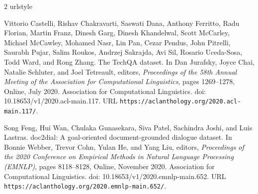 \begin{thebibliography}{2}
\providecommand{\natexlab}[1]{#1}
\providecommand{\url}[1]{\texttt{#1}}
\expandafter\ifx\csname urlstyle\endcsname\relax
  \providecommand{\doi}[1]{doi: #1}\else
  \providecommand{\doi}{doi: \begingroup \urlstyle{rm}\Url}\fi

Vittorio Castelli, Rishav Chakravarti, Saswati Dana, Anthony Ferritto, Radu
  Florian, Martin Franz, Dinesh Garg, Dinesh Khandelwal, Scott McCarley,
  Michael McCawley, Mohamed Nasr, Lin Pan, Cezar Pendus, John Pitrelli, Saurabh
  Pujar, Salim Roukos, Andrzej Sakrajda, Avi Sil, Rosario Uceda-Sosa, Todd
  Ward, and Rong Zhang.
\newblock The {T}ech{QA} dataset.
\newblock In Dan Jurafsky, Joyce Chai, Natalie Schluter, and Joel Tetreault,
  editors, \emph{Proceedings of the 58th Annual Meeting of the Association for
  Computational Linguistics}, pages 1269--1278, Online, July 2020. Association
  for Computational Linguistics.
\newblock \doi{10.18653/v1/2020.acl-main.117}.
\newblock URL \url{https://aclanthology.org/2020.acl-main.117/}.

Song Feng, Hui Wan, Chulaka Gunasekara, Siva Patel, Sachindra Joshi, and Luis
  Lastras.
\newblock doc2dial: A goal-oriented document-grounded dialogue dataset.
\newblock In Bonnie Webber, Trevor Cohn, Yulan He, and Yang Liu, editors,
  \emph{Proceedings of the 2020 Conference on Empirical Methods in Natural
  Language Processing (EMNLP)}, pages 8118--8128, Online, November 2020.
  Association for Computational Linguistics.
\newblock \doi{10.18653/v1/2020.emnlp-main.652}.
\newblock URL \url{https://aclanthology.org/2020.emnlp-main.652/}.

\end{thebibliography}

